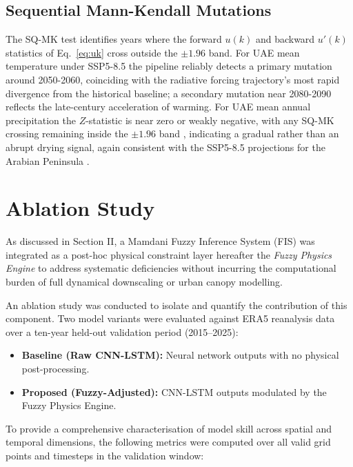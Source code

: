 \documentclass[conference]{IEEEtran}
\begin{document}
\subsection{Sequential Mann-Kendall Mutations}

The SQ-MK test identifies years where the forward \(u(k)\) and backward
\(u'(k)\) statistics of Eq.~\eqref{eq:uk} cross outside the \(\pm 1.96\)
band.  For UAE mean temperature under SSP5-8.5 the pipeline
reliably detects a primary mutation around 2050-2060, coinciding with
the radiative forcing trajectory's most rapid divergence from the
historical baseline; a secondary mutation near 2080-2090 reflects the
late-century acceleration of warming.  For UAE mean annual precipitation
the \(Z\)-statistic is near zero or weakly negative, with any SQ-MK
crossing remaining inside the \(\pm 1.96\) band ,  indicating a gradual
rather than an abrupt drying signal, again consistent with the SSP5-8.5
projections for the Arabian Peninsula \cite{ipcc2021ar6}.

\section{Ablation Study}
\label{sec:ablation_study}

As discussed in Section II, a Mamdani Fuzzy Inference System (FIS) was integrated as a post-hoc physical 
constraint layer hereafter the \textit{Fuzzy Physics Engine} to address
systematic deficiencies without incurring the computational burden of full dynamical 
downscaling or urban canopy modelling.

An ablation study was conducted to isolate and quantify the contribution of this 
component. Two model variants were evaluated against ERA5 reanalysis data \cite{
hersbach2020era5} over a ten-year held-out validation period (2015--2025):

\begin{itemize}
    \item \textbf{Baseline (Raw CNN-LSTM):} Neural network outputs with no physical 
    post-processing.
    \item \textbf{Proposed (Fuzzy-Adjusted):} CNN-LSTM outputs modulated by the Fuzzy 
    Physics Engine.
\end{itemize}

To provide a comprehensive characterisation of model skill across spatial and temporal dimensions, the following metrics were computed over all valid grid 
points and timesteps in the validation window:
\end{document}
